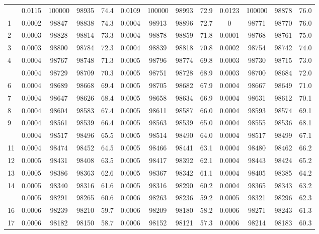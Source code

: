 \documentclass[
  14pt,
]{article}
\begin{document}
\begin{longtable}[t]{lcccccccccccc}
\endfoot
\bottomrule
\endlastfoot
0 & 0.0115 & 100000 & 98935 & 74.4 & 0.0109 & 100000 & 98993 & 72.9 & 0.0123 & 100000 & 98878 & 76.0\\
1 & 0.0002 & 98847 & 98838 & 74.3 & 0.0004 & 98913 & 98896 & 72.7 & 0 & 98771 & 98770 & 76.0\\
2 & 0.0003 & 98828 & 98814 & 73.3 & 0.0004 & 98878 & 98859 & 71.8 & 0.0001 & 98768 & 98761 & 75.0\\
3 & 0.0003 & 98800 & 98784 & 72.3 & 0.0004 & 98839 & 98818 & 70.8 & 0.0002 & 98754 & 98742 & 74.0\\
4 & 0.0004 & 98767 & 98748 & 71.3 & 0.0005 & 98796 & 98774 & 69.8 & 0.0003 & 98730 & 98715 & 73.0\\
\addlinespace
5 & 0.0004 & 98729 & 98709 & 70.3 & 0.0005 & 98751 & 98728 & 68.9 & 0.0003 & 98700 & 98684 & 72.0\\
6 & 0.0004 & 98689 & 98668 & 69.4 & 0.0005 & 98705 & 98682 & 67.9 & 0.0004 & 98667 & 98649 & 71.0\\
7 & 0.0004 & 98647 & 98626 & 68.4 & 0.0005 & 98658 & 98634 & 66.9 & 0.0004 & 98631 & 98612 & 70.1\\
8 & 0.0004 & 98604 & 98583 & 67.4 & 0.0005 & 98611 & 98587 & 66.0 & 0.0004 & 98593 & 98574 & 69.1\\
9 & 0.0004 & 98561 & 98539 & 66.4 & 0.0005 & 98563 & 98539 & 65.0 & 0.0004 & 98555 & 98536 & 68.1\\
\addlinespace
10 & 0.0004 & 98517 & 98496 & 65.5 & 0.0005 & 98514 & 98490 & 64.0 & 0.0004 & 98517 & 98499 & 67.1\\
11 & 0.0004 & 98474 & 98452 & 64.5 & 0.0005 & 98466 & 98441 & 63.1 & 0.0004 & 98480 & 98462 & 66.2\\
12 & 0.0005 & 98431 & 98408 & 63.5 & 0.0005 & 98417 & 98392 & 62.1 & 0.0004 & 98443 & 98424 & 65.2\\
13 & 0.0005 & 98386 & 98363 & 62.6 & 0.0005 & 98367 & 98342 & 61.1 & 0.0004 & 98405 & 98385 & 64.2\\
14 & 0.0005 & 98340 & 98316 & 61.6 & 0.0005 & 98316 & 98290 & 60.2 & 0.0004 & 98365 & 98343 & 63.2\\
\addlinespace
15 & 0.0005 & 98291 & 98265 & 60.6 & 0.0006 & 98263 & 98236 & 59.2 & 0.0005 & 98321 & 98296 & 62.3\\
16 & 0.0006 & 98239 & 98210 & 59.7 & 0.0006 & 98209 & 98180 & 58.2 & 0.0006 & 98271 & 98243 & 61.3\\
17 & 0.0006 & 98182 & 98150 & 58.7 & 0.0006 & 98152 & 98121 & 57.3 & 0.0006 & 98214 & 98183 & 60.3\\

\end{longtable}
\end{document}
